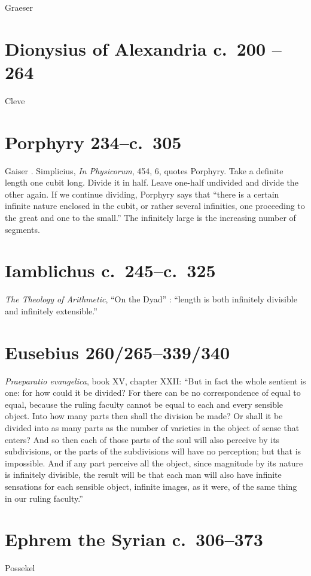 \documentclass{article}
\begin{document}
Graeser \cite{graeser}


\section{Dionysius of Alexandria c.~200 -- 264}
Cleve \cite{cleve}



\section{Porphyry 234--c.~305}
Gaiser \cite[p.~482]{gaiser}. Simplicius, {\em In Physicorum}, 454, 6, quotes Porphyry. Take a definite length one cubit long.
Divide it in half. Leave one-half undivided and divide the other again. If we continue dividing, Porphyry says that ``there is a certain
infinite nature enclosed in the cubit, or rather several infinities, one proceeding to the great and one to the small.'' The infinitely large is the increasing
number of segments.

\section{Iamblichus c.~245--c.~325}
{\em The Theology of Arithmetic}, ``On the Dyad'' \cite[p.~45]{iamblichus}: ``length is both infinitely divisible and infinitely extensible.''




\section{Eusebius 260/265--339/340}
{\em Praeparatio evangelica}, book XV, chapter XXII: ``But in fact the whole sentient is one: for how could it be divided? For there can be no correspondence of equal to equal, because the ruling faculty cannot be equal to each and every sensible object. Into how many parts then shall the division be made? Or shall it be divided into as many parts as the number of varieties in the object of sense that enters? And so then each of those parts of the soul will also perceive by its subdivisions, or the parts of the subdivisions will have no perception; but that is impossible. And if any part perceive all the object, since magnitude by its nature is infinitely divisible, the result will be that each man will also have infinite sensations for each sensible object, infinite images, as it were, of the same thing in our ruling faculty.''

\section{Ephrem the Syrian c.~306--373}
Possekel \cite{possekel}
\end{document}
